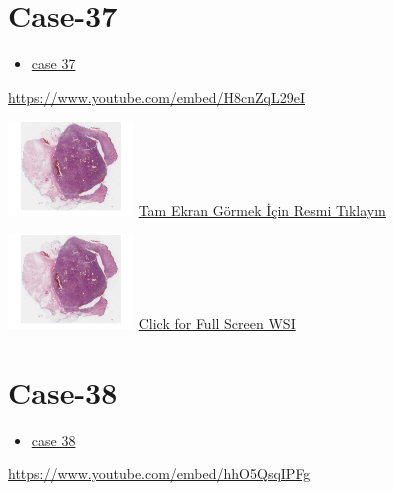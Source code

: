 \documentclass[
  letterpaper,
  paper=6in:9in,
  pagesize=pdftex,
  headinclude=on,
  footinclude=on,
  12pt]{scrbook}
\providecommand{\tightlist}{%
  \setlength{\itemsep}{0pt}\setlength{\parskip}{0pt}}\usepackage{longtable,booktabs,array}
\begin{document}
\hypertarget{sec-hacettepe-case-of-the-month-case-37}{%
\section{Case-37}\label{sec-hacettepe-case-of-the-month-case-37}}

\begin{itemize}
\tightlist
\item
  \href{https://www.youtube.com/watch?v=H8cnZqL29eI\&ab_channel=KemalKosemehmetoglu}{case
  37}
\end{itemize}

\url{https://www.youtube.com/embed/H8cnZqL29eI}

\href{https://images.patolojiatlasi.com/hacettepe-com-case-1/HE.html}{\includegraphics[width=0.25\textwidth,height=\textheight]{./screenshots/hacettepe-com-case-1_screenshot.png}}
\href{https://images.patolojiatlasi.com/hacettepe-com-case-/HE.html}{Tam
Ekran Görmek İçin Resmi Tıklayın}

\href{https://images.patolojiatlasi.com/hacettepe-com-case-1/HE.html}{\includegraphics[width=0.25\textwidth,height=\textheight]{./screenshots/hacettepe-com-case-1_screenshot.png}}
\href{https://images.patolojiatlasi.com/hacettepe-com-case-/HE.html}{Click
for Full Screen WSI}

\hypertarget{sec-hacettepe-case-of-the-month-case-38}{%
\section{Case-38}\label{sec-hacettepe-case-of-the-month-case-38}}

\begin{itemize}
\tightlist
\item
  \href{https://www.youtube.com/watch?v=hhO5QsqIPFg\&ab_channel=KemalKosemehmetoglu}{case
  38}
\end{itemize}

\url{https://www.youtube.com/embed/hhO5QsqIPFg}
\end{document}
